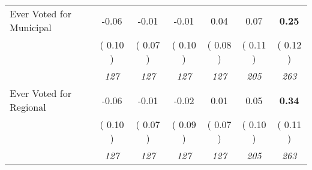 \begin{tabular}{l c c c c c c}
Ever Voted for Municipal &     -0.06 &     -0.01 &     -0.01 &      0.04 &      0.07 & \textbf{      0.25 } \\
& (     0.10 ) & (     0.07 ) & (     0.10 ) & (     0.08 ) & (     0.11 ) & (     0.12 ) \\
& \textit{ 127 } & \textit{ 127 } & \textit{ 127 } & \textit{ 127 } & \textit{ 205 } & \textit{ 263 } \\
Ever Voted for Regional &     -0.06 &     -0.01 &     -0.02 &      0.01 &      0.05 & \textbf{      0.34 } \\
& (     0.10 ) & (     0.07 ) & (     0.09 ) & (     0.07 ) & (     0.10 ) & (     0.11 ) \\
& \textit{ 127 } & \textit{ 127 } & \textit{ 127 } & \textit{ 127 } & \textit{ 205 } & \textit{ 263 } \\
\bottomrule
\end{tabular}
